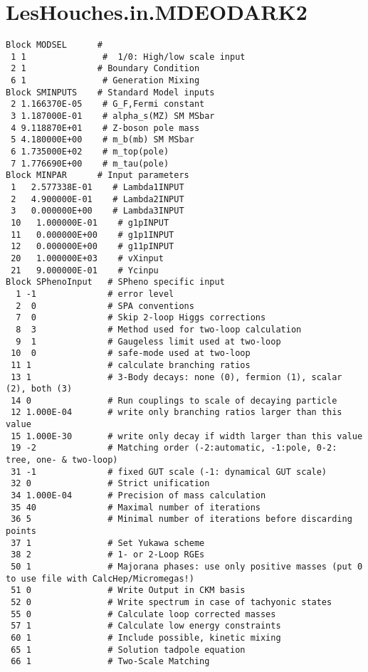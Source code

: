 \section{LesHouches.in.MDEODARK2}
\begin{lstlisting}
Block MODSEL      #  
 1 1               #  1/0: High/low scale input 
 2 1              # Boundary Condition  
 6 1               # Generation Mixing 
Block SMINPUTS    # Standard Model inputs 
 2 1.166370E-05    # G_F,Fermi constant 
 3 1.187000E-01    # alpha_s(MZ) SM MSbar 
 4 9.118870E+01    # Z-boson pole mass 
 5 4.180000E+00    # m_b(mb) SM MSbar 
 6 1.735000E+02    # m_top(pole) 
 7 1.776690E+00    # m_tau(pole) 
Block MINPAR      # Input parameters 
 1   2.577338E-01    # Lambda1INPUT
 2   4.900000E-01    # Lambda2INPUT
 3   0.000000E+00    # Lambda3INPUT
 10   1.000000E-01    # g1pINPUT
 11   0.000000E+00    # g1p1INPUT
 12   0.000000E+00    # g11pINPUT
 20   1.000000E+03    # vXinput
 21   9.000000E-01    # Ycinpu
Block SPhenoInput   # SPheno specific input 
  1 -1              # error level 
  2  0              # SPA conventions 
  7  0              # Skip 2-loop Higgs corrections 
  8  3              # Method used for two-loop calculation 
  9  1              # Gaugeless limit used at two-loop 
 10  0              # safe-mode used at two-loop 
 11 1               # calculate branching ratios 
 13 1               # 3-Body decays: none (0), fermion (1), scalar (2), both (3) 
 14 0               # Run couplings to scale of decaying particle 
 12 1.000E-04       # write only branching ratios larger than this value 
 15 1.000E-30       # write only decay if width larger than this value 
 19 -2              # Matching order (-2:automatic, -1:pole, 0-2: tree, one- & two-loop) 
 31 -1              # fixed GUT scale (-1: dynamical GUT scale) 
 32 0               # Strict unification 
 34 1.000E-04       # Precision of mass calculation 
 35 40              # Maximal number of iterations
 36 5               # Minimal number of iterations before discarding points
 37 1               # Set Yukawa scheme  
 38 2               # 1- or 2-Loop RGEs 
 50 1               # Majorana phases: use only positive masses (put 0 to use file with CalcHep/Micromegas!) 
 51 0               # Write Output in CKM basis 
 52 0               # Write spectrum in case of tachyonic states 
 55 0               # Calculate loop corrected masses 
 57 1               # Calculate low energy constraints 
 60 1               # Include possible, kinetic mixing 
 65 1               # Solution tadpole equation 
 66 1               # Two-Scale Matching 

\end{lstlisting}
